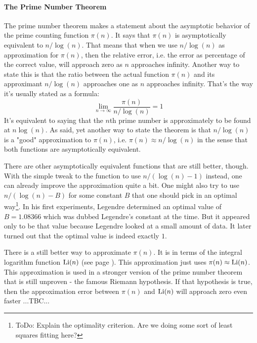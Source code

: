 \paragraph{The Prime Number Theorem}
The prime number theorem makes a statement about the asymptotic behavior of the prime counting function $\pi(n)$. It says that $\pi(n)$ is asymptotically equivalent to $n / \log(n)$. That means that when we use $n / \log(n)$ as approximation for $\pi(n)$, then the relative error, i.e. the error as percentage of the correct value, will approach zero as $n$ approaches infinity. Another way to state this is that the ratio between the actual function $\pi(n)$ and its approximant $n / \log(n)$ approaches one as $n$ approaches infinity. That's the way it's usually stated as a formula:
\begin{equation}
 \lim_{n \rightarrow \infty}  \frac{\pi(n)}{n / \log(n) }  = 1
\end{equation}
It's equivalent to saying that the $n$th prime number is approximately to be found at $n \log(n)$. As said, yet another way to state the theorem is that $n / \log(n)$ is a "good" approximation to $\pi(n)$, i.e. $\pi(n) \approx n / \log(n)$ in the sense that both functions are asymptotically equivalent. 

\medskip
There are other asymptotically equivalent functions that are still better, though. With the simple tweak to the function to use $n / (\log(n) - 1)$ instead, one can already improve the approximation quite a bit. One might also try to use $n / (\log(n) - B)$ for some constant $B$ that one should pick in an optimal way\footnote{ToDo: Explain the optimality criterion. Are we doing some sort of least squares fitting here?}. In his first experiments, Legendre determined an optimal value of $B = 1.08366$ which was dubbed Legendre's constant at the time. But it appeared only to be that value because Legendre looked at a small amount of data. It later turned out that the optimal value is indeed exactly $1$.

\medskip
There is a still better way to approximate $\pi(n)$. It is in terms of the integral logarithm function $\operatorname{Li}(n)$ (see page \pageref{Eq:LogarithmicIntegral}). This approximation just uses $\pi(n) \approx \operatorname{Li}(n)$. This approximation is used in a stronger version of the prime number theorem that is still unproven - the famous Riemann hypothesis. If that hypothesis is true, then the approximation error between $\pi(n)$ and $\operatorname{Li}(n)$ will approach zero even faster ...TBC...


